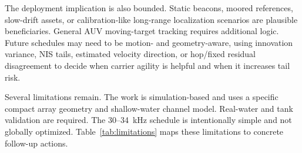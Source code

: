 \documentclass[journal]{IEEEtran}
\begin{document}
The deployment implication is also bounded. Static beacons, moored references, slow-drift assets,
or calibration-like long-range localization scenarios are plausible beneficiaries. General AUV
moving-target tracking requires additional logic. Future schedules may need to be motion- and
geometry-aware, using innovation variance, NIS tails, estimated velocity direction, or hop/fixed
residual disagreement to decide when carrier agility is helpful and when it increases tail risk.

Several limitations remain. The work is simulation-based and uses a specific compact array geometry
and shallow-water channel model. Real-water and tank validation are required. The 30--34~kHz
schedule is intentionally simple and not globally optimized. Table~\ref{tab:limitations} maps these
limitations to concrete follow-up actions.
\end{document}
